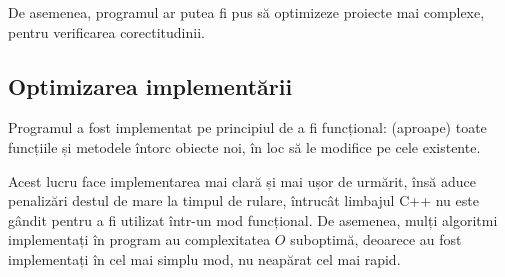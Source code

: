 De asemenea, programul ar putea fi pus să optimizeze proiecte mai complexe,
pentru verificarea corectitudinii.

\subsection{Optimizarea implementării}
Programul a fost implementat pe principiul de a fi funcțional: (aproape) toate
funcțiile și metodele întorc obiecte noi, în loc să le modifice pe cele
existente.

Acest lucru face implementarea mai clară și mai ușor de urmărit, însă aduce
penalizări destul de mare la timpul de rulare, întrucât limbajul C++ nu este
gândit pentru a fi utilizat într-un mod funcțional.
De asemenea, mulți algoritmi implementați în program au complexitatea $O$
suboptimă, deoarece au fost implementați în cel mai simplu mod, nu neapărat cel
mai rapid.
